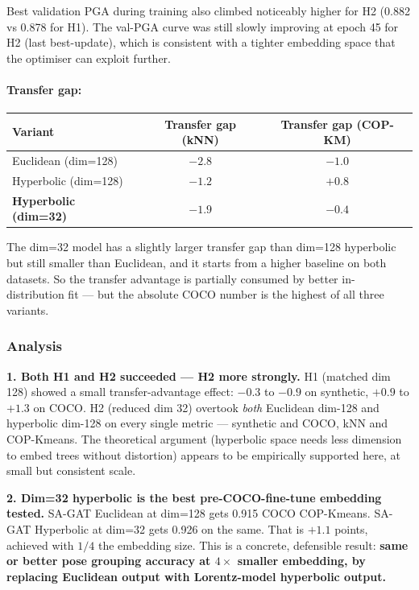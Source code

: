 Best validation PGA during training also climbed noticeably higher for H2 (0.882 vs 0.878 for H1). The val-PGA curve was still slowly improving at epoch 45 for H2 (last best-update), which is consistent with a tighter embedding space that the optimiser can exploit further.

\paragraph{Transfer gap:}

\begin{tabular}{lcc}
\hline
\textbf{Variant} & \textbf{Transfer gap (kNN)} & \textbf{Transfer gap (COP-KM)} \\
\hline
Euclidean (dim=128) & $-2.8$ & $-1.0$ \\
Hyperbolic (dim=128) & $-1.2$ & $+0.8$ \\
\textbf{Hyperbolic (dim=32)} & $-1.9$ & $-0.4$ \\
\hline
\end{tabular}

\vspace{0.5em}

The dim=32 model has a slightly larger transfer gap than dim=128 hyperbolic but still smaller than Euclidean, and it starts from a higher baseline on both datasets. So the transfer advantage is partially consumed by better in-distribution fit --- but the absolute COCO number is the highest of all three variants.

\subsubsection{Analysis}

\textbf{1. Both H1 and H2 succeeded --- H2 more strongly.} H1 (matched dim 128) showed a small transfer-advantage effect: $-0.3$ to $-0.9$ on synthetic, $+0.9$ to $+1.3$ on COCO. H2 (reduced dim 32) overtook \emph{both} Euclidean dim-128 and hyperbolic dim-128 on every single metric --- synthetic and COCO, kNN and COP-Kmeans. The theoretical argument (hyperbolic space needs less dimension to embed trees without distortion) appears to be empirically supported here, at small but consistent scale.

\textbf{2. Dim=32 hyperbolic is the best pre-COCO-fine-tune embedding tested.} SA-GAT Euclidean at dim=128 gets 0.915 COCO COP-Kmeans. SA-GAT Hyperbolic at dim=32 gets 0.926 on the same. That is $+1.1$ points, achieved with $1/4$ the embedding size. This is a concrete, defensible result: \textbf{same or better pose grouping accuracy at $4\times$ smaller embedding, by replacing Euclidean output with Lorentz-model hyperbolic output.}

